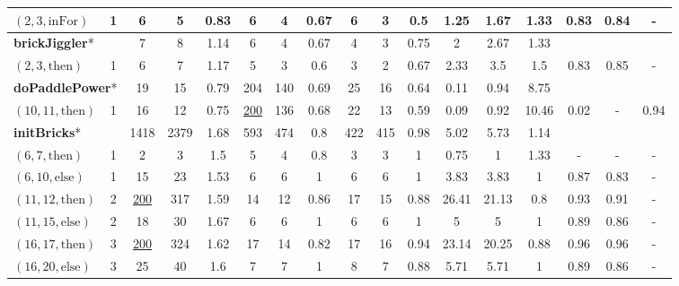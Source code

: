 \documentclass[sigconf]{acmart}
\newcommand{\thenBr}{\text{then}}
\newcommand{\elseBr}{\text{else}}
\newcommand{\inFor}{\text{inFor}}
\newcommand{\un}[1]{\underline{#1}}
\begin{document}
\begin{table}[!t]
\begin{tabular}{lc|ccc|ccc|ccc|ccc|ccc}
    $(2,3,\inFor)$    & 1        & 6        & 5    & 0.83      & 6  & 4 & 0.67              & 6  & 3  & 0.5                & 1.25   & 1.67 & 1.33   & 0.83 & 0.84 & -  \\
    \toprule
\multicolumn{2}{l|}{\textbf{brickJiggler}*}   
                                 & 7        & 8    & 1.14      & 6  & 4 & 0.67              & 4  & 3  & 0.75               & 2      & 2.67 & 1.33   &      &      &       \\
    $(2,3,\thenBr)$   & 1        & 6        & 7    & 1.17      & 5  & 3 & 0.6               & 3  & 2  & 0.67               & 2.33   & 3.5  & 1.5    & 0.83 & 0.85 & -  \\
    \hline
\multicolumn{2}{l|}{\textbf{doPaddlePower}*}  
                                 & 19       & 15   & 0.79      & 204  & 140 & 0.69          & 25 & 16  & 0.64              & 0.11   & 0.94 & 8.75   &       &      &      \\
    $(10,11,\thenBr)$ & 1        & 16       & 12   & 0.75      & \un{200} & 136 & 0.68      & 22 & 13  & 0.59              & 0.09   & 0.92 & 10.46  &  0.02 & - & 0.94 \\
    \hline
\multicolumn{2}{l|}{\textbf{initBricks}*}     
                                 & 1418     & 2379 & 1.68      & 593  & 474 & 0.8           & 422 & 415 & 0.98             & 5.02   & 5.73  & 1.14   &      &      &       \\
    $(6,7,\thenBr)$   & 1        & 2        & 3    & 1.5       & 5    & 4   & 0.8           & 3   & 3   & 1                & 0.75   & 1     & 1.33   & - & -  & -   \\
    $(6,10,\elseBr)$  & 1        & 15       & 23   & 1.53      & 6    & 6   & 1             & 6   & 6   & 1                & 3.83   & 3.83  & 1      & 0.87 & 0.83 & -   \\
    $(11,12,\thenBr)$ & 2        & \un{200} & 317  & 1.59      & 14   & 12  & 0.86          & 17  & 15  & 0.88             & 26.41  & 21.13 & 0.8    & 0.93 & 0.91 & -  \\
    $(11,15,\elseBr)$ & 2        & 18       & 30   & 1.67      & 6    & 6   & 1             & 6   & 6   & 1                & 5      & 5     & 1      & 0.89 & 0.86 & -  \\
    $(16,17,\thenBr)$ & 3        & \un{200} & 324  & 1.62      & 17   & 14  & 0.82          & 17  & 16  & 0.94             & 23.14  & 20.25 & 0.88   & 0.96 & 0.96 & -  \\
    $(16,20,\elseBr)$ & 3        & 25       & 40   & 1.6       & 7    & 7   & 1             & 8   & 7   & 0.88             & 5.71   & 5.71  & 1      & 0.89 & 0.86 & -  \\

\end{tabular}
\end{table}
\end{document}
